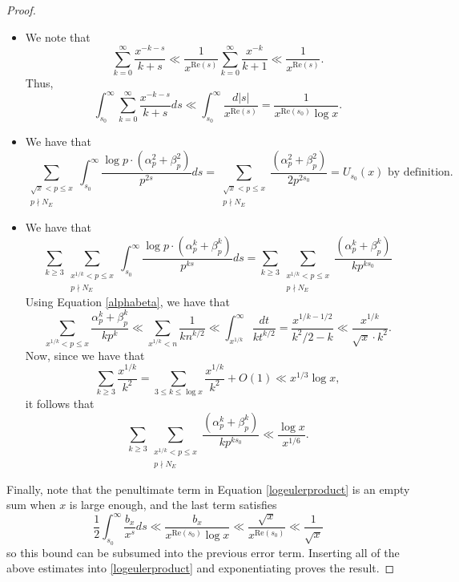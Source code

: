 \documentclass[12pt,reqno]{amsart}
\theoremstyle{definition}
\numberwithin{equation}{section}
\renewcommand{\Re}{\mathrm{Re}}
\begin{document}
\begin{proof}
\begin{itemize}
\item We note that 
\begin{equation*}
\sum_{k=0}^{\infty} \frac{x^{-k-s}}{k+s}
\ll \frac{1}{x^{\Re(s)}} \sum_{k=0}^{\infty}  \frac{x^{-k}}{k+1} \ll \frac{1}{x^{\Re(s)}}. 
\end{equation*}
Thus, 
\begin{equation*}
\int_{s_0}^{\infty} \sum_{k=0}^{\infty} \frac{x^{-k-s}}{k+s} ds \ll \int_{s_0}^{\infty} \frac{d|s|}{x^{\Re(s)} }= \frac{1}{x^{\Re(s_0)} \log x}. 
\end{equation*}

\item We have that 
\begin{equation*}
\sum_{\substack{\sqrt x < p \leq x \\ p \nmid  N_E}} \int_{s_0}^{\infty} \frac{\log p \cdot (\alpha_p^2+\beta_p^2)}{p^{2s}}ds = \sum_{\substack{\sqrt x < p \leq x \\ p \nmid  N_E}} \frac{(\alpha_p^2+\beta_p^2) }{2p^{2s_0}}=U_{s_0}(x) \textrm{ by definition. }
\end{equation*}


\item  We have that 
$$
 \sum_{k \geq 3} \sum_{\substack{x^{1/k} < p \leq x \\ p \nmid  N_E}} \int_{s_0}^{\infty} \frac{\log p \cdot (\alpha_p^k+\beta_p^k)}{p^{ks}}ds =  \sum_{k \geq 3} \sum_{\substack{x^{1/k} < p \leq x \\ p \nmid  N_E}} \frac{(\alpha_p^k+\beta_p^k) }{kp^{ks_0}} 
$$
Using Equation \eqref{alphabeta}, we have that 
\begin{equation*}
\sum_{x^{1/k}<p \leq x} \frac{\alpha_p^k+\beta_p^k}{k p^k} \ll \sum_{x^{1/k}<n} \frac{1}{k n^{k/2} } \ll \int_{x^{1/k} }^{\infty} \frac{dt}{k t^{k/2} }= \frac{x^{{1/k}-1/2}}{k^2/2-k} \ll \frac{x^{1/k}}{\sqrt x \cdot k^2}. 
\end{equation*}
Now, since we have that
\begin{equation*}
\sum_{k \geq 3} \frac{x^{1/k} }{k^2} = \sum_{3 \leq k \leq \log x} \frac{x^{1/k} }{k^2} +O(1) \ll x^{1/3} \log x, 
\end{equation*}
it follows that 
$$
\sum_{k \geq 3} \sum_{\substack{ x^{1/k} < p \leq x \\ p \nmid  N_E}} \frac{(\alpha_p^k+\beta_p^k) }{kp^{ks_0}} \ll \frac{\log x}{x^{1/6}}. 
$$
\end{itemize}

Finally, note that the penultimate term in Equation \eqref{logeulerproduct} is an empty sum when $x$ is large enough, and the last term satisfies 
$$
\frac{1}{2} \int_{s_0}^{\infty} \frac{b_x}{x^s} ds \ll \frac{b_x}{x^{ \Re(s_0)} \log x} \ll  \frac{\sqrt x}{x^{ \Re(s_0) }} \ll \frac{1}{\sqrt x}
$$
so this bound can be subsumed into the previous error term. Inserting all of the above estimates into \eqref{logeulerproduct} and exponentiating proves the result. 
\end{proof}
\end{document}
